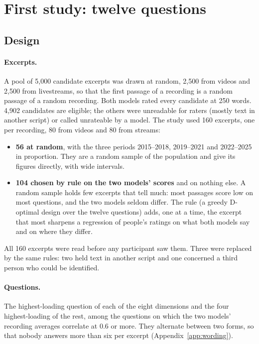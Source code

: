 \section{First study: twelve questions}\label{sec:first}

\subsection{Design}\label{sec:firstdesign}

\paragraph{Excerpts.} A pool of 5{,}000 candidate excerpts was drawn at random, 2{,}500 from videos and 2{,}500
from livestreams, so that the first passage of a recording is a random passage of a random recording. Both
models rated every candidate at 250 words. 4{,}902 candidates are eligible; the others were unreadable for
raters (mostly text in another script) or called unrateable by a model. The study used 160 excerpts, one per
recording, 80 from videos and 80 from streams:
\begin{itemize}
\item \textbf{56 at random}, with the three periods 2015--2018, 2019--2021 and 2022--2025 in proportion. They are a
  random sample of the population and give its figures directly, with wide intervals.
\item \textbf{104 chosen by rule on the two models' scores} and on nothing else. A random sample holds few
  excerpts that tell much: most passages score low on most questions, and the two models seldom differ. The rule
  (a greedy D-optimal design over the twelve questions) adds, one at a time, the excerpt that most sharpens a
  regression of people's ratings on what both models say and on where they differ.
\end{itemize}
All 160 excerpts were read before any participant saw them. Three were replaced by the same rules: two held
text in another script and one concerned a third person who could be identified.

\paragraph{Questions.} The highest-loading question of each of the eight dimensions and the four
highest-loading of the rest, among the questions on which the two models' recording averages correlate at 0.6
or more. They alternate between two forms, so that nobody answers more than six per excerpt
(Appendix~\ref{app:wording}).

